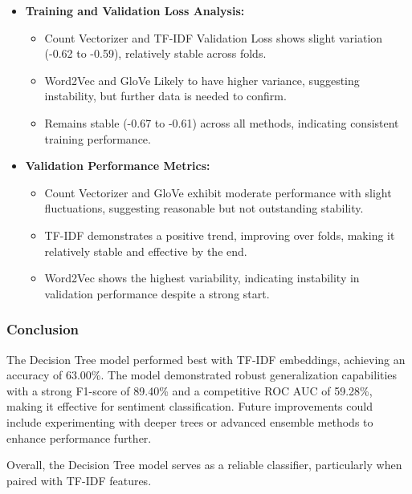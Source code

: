 \begin{itemize}
    \item \textbf{Training and Validation Loss Analysis:}
    \begin{itemize}
        \item Count Vectorizer and TF-IDF Validation Loss shows slight variation (-0.62 to -0.59), relatively stable across folds.
        \item Word2Vec and GloVe Likely to have higher variance, suggesting instability, but further data is needed to confirm.
        \item Remains stable (-0.67 to -0.61) across all methods, indicating consistent training performance.
    \end{itemize}
    
    \item \textbf{Validation Performance Metrics:}
    \begin{itemize}
        \item Count Vectorizer and GloVe exhibit moderate performance with slight fluctuations, suggesting reasonable but not outstanding stability.
        \item TF-IDF demonstrates a positive trend, improving over folds, making it relatively stable and effective by the end.
        \item Word2Vec shows the highest variability, indicating instability in validation performance despite a strong start.
    \end{itemize}
\end{itemize}

\subsubsection{Conclusion}

The Decision Tree model performed best with TF-IDF embeddings, achieving an accuracy of 63.00\%. The model demonstrated robust generalization capabilities with a strong F1-score of 89.40\% and a competitive ROC AUC of 59.28\%, making it effective for sentiment classification. Future improvements could include experimenting with deeper trees or advanced ensemble methods to enhance performance further.

Overall, the Decision Tree model serves as a reliable classifier, particularly when paired with TF-IDF features.

